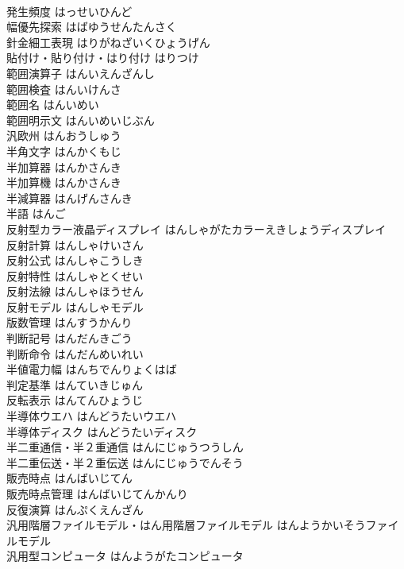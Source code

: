 \documentclass[8pt]{extreport}
\begin{document}
\begin{CJK}{UTF8}{min}
\\	発生頻度	はっせいひんど	
\\	幅優先探索	はばゆうせんたんさく	
\\	針金細工表現	はりがねざいくひょうげん	
\\	貼付け・貼り付け・はり付け	はりつけ	
\\	範囲演算子	はんいえんざんし	
\\	範囲検査	はんいけんさ	
\\	範囲名	はんいめい	
\\	範囲明示文	はんいめいじぶん	
\\	汎欧州	はんおうしゅう	
\\	半角文字	はんかくもじ	
\\	半加算器	はんかさんき	
\\	半加算機	はんかさんき	
\\	半減算器	はんげんさんき	
\\	半語	はんご	
\\	反射型カラー液晶ディスプレイ	はんしゃがたカラーえきしょうディスプレイ	
\\	反射計算	はんしゃけいさん	
\\	反射公式	はんしゃこうしき	
\\	反射特性	はんしゃとくせい	
\\	反射法線	はんしゃほうせん	
\\	反射モデル	はんしゃモデル	
\\	版数管理	はんすうかんり	
\\	判断記号	はんだんきごう	
\\	判断命令	はんだんめいれい	
\\	半値電力幅	はんちでんりょくはば	
\\	判定基準	はんていきじゅん	
\\	反転表示	はんてんひょうじ	
\\	半導体ウエハ	はんどうたいウエハ	
\\	半導体ディスク	はんどうたいディスク	
\\	半二重通信・半２重通信	はんにじゅうつうしん	
\\	半二重伝送・半２重伝送	はんにじゅうでんそう	
\\	販売時点	はんばいじてん	
\\	販売時点管理	はんばいじてんかんり	
\\	反復演算	はんぷくえんざん	
\\	汎用階層ファイルモデル・はん用階層ファイルモデル	はんようかいそうファイルモデル	
\\	汎用型コンピュータ	はんようがたコンピュータ	

\end{CJK}
\end{document}

